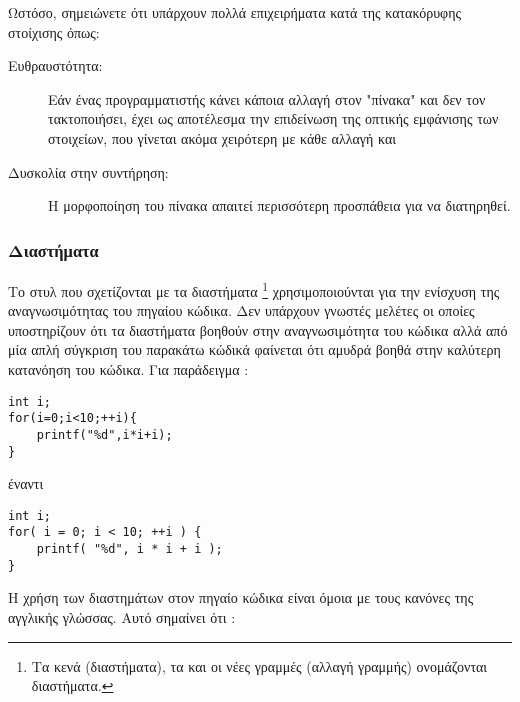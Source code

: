 Ωστόσο, σημειώνετε ότι υπάρχουν πολλά επιχειρήματα κατά της κατακόρυφης στοίχισης όπως:

\begin{description}
\item [Ευθραυστότητα: ] Εάν ένας προγραμματιστής κάνει κάποια αλλαγή στον "πίνακα" και δεν τον τακτοποιήσει, έχει ως αποτέλεσμα την επιδείνωση της οπτικής εμφάνισης των στοιχείων, που γίνεται ακόμα χειρότερη με κάθε αλλαγή και
\item [Δυσκολία στην συντήρηση: ] Η μορφοποίηση του πίνακα απαιτεί περισσότερη προσπάθεια για να διατηρηθεί.
\end{description}

\subsubsection{Διαστήματα}

Το στυλ που σχετίζονται με τα διαστήματα \footnote{Τα κενά (διαστήματα), τα  και οι νέες γραμμές (αλλαγή γραμμής) ονομάζονται διαστήματα.} χρησιμοποιούνται για την ενίσχυση της αναγνωσιμότητας του πηγαίου κώδικα. Δεν υπάρχουν γνωστές μελέτες οι οποίες υποστηρίζουν ότι τα διαστήματα βοηθούν στην αναγνωσιμότητα του κώδικα αλλά από μία απλή σύγκριση του παρακάτω κώδικά φαίνεται ότι αμυδρά βοηθά στην καλύτερη κατανόηση του κώδικα. Για παράδειγμα \cite{wiki:Programming_style}: 

\begin{lstlisting}[style=cpp, caption= Διαστήματα (1), label=program:spaces(1)]
int i;
for(i=0;i<10;++i){
    printf("%d",i*i+i);
}
\end{lstlisting}

έναντι

\begin{lstlisting}[style=cpp, caption= Διαστήματα (2), label=program:spaces(2)]
int i;
for( i = 0; i < 10; ++i ) {
    printf( "%d", i * i + i );
}
\end{lstlisting}

Η χρήση των διαστημάτων στον πηγαίο κώδικα είναι όμοια με τους κανόνες της αγγλικής γλώσσας. Αυτό σημαίνει ότι \cite{site:codding_matters}:

